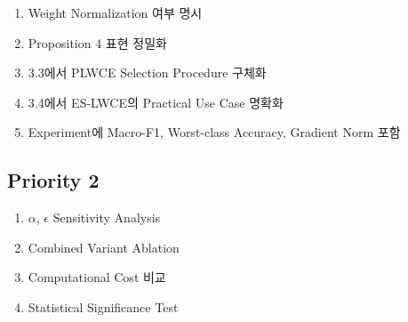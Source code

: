 \documentclass[11pt,a4paper]{article}
\begin{document}
\begin{enumerate}
\item Weight Normalization 여부 명시
\item Proposition 4 표현 정밀화
\item 3.3에서 PLWCE Selection Procedure 구체화
\item 3.4에서 ES-LWCE의 Practical Use Case 명확화
\item Experiment에 Macro-F1, Worst-class Accuracy, Gradient Norm 포함
\end{enumerate}

\subsection{Priority 2}

\begin{enumerate}
\item \(\alpha\), \(\epsilon\) Sensitivity Analysis
\item Combined Variant Ablation
\item Computational Cost 비교
\item Statistical Significance Test
\end{enumerate}
\end{document}
